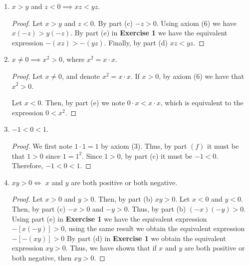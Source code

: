 \documentclass[12pt]{article}
\begin{document}
\begin{enumerate}[label=(\alph*)]
\begin{proof}
			Finally, we consider the case $x > 0$. If $y = 0$, we find a case analogous to when $x = 0$,
			under which by following it's logic we once again land that $-y > -x$. If $y < 0$, we note
			that $-y > 0$ and that $-x < 0$, and thus $-y > -x$. If $y > 0$, we make use of axiom (6)
			to obtain the expression $x - x > y - x$, which is equivalent to $0 > y - x$. Using axiom
			(6) once more we obtain the expression $0 - y > y - x - y$, which is equivalent
			to $-y > -x$.
		\end{proof}
		\item $x > y$ and $z < 0 \implies xz < yz$.
		\begin{proof}
			Let $x > y$ and $z < 0$. By part (c) $-z > 0$. Using axiom (6) we have $x(-z) > y(-z)$.
			By part (e) in \textbf{Exercise 1} we have the equivalent expression $-(xz) > -(yz)$.
			Finally, by part (d) $xz < yz$.
		\end{proof}
		\item $x \neq 0 \implies x^2 > 0$, where $x^2 = x \cdot x$.
		\begin{proof}
			Let $x \neq 0$, and denote $x^2 = x \cdot x$. If $x > 0$, by axiom (6) we have that 
			$x^2 > 0$. 
			
			Let $x < 0$. Then, by part (e) we note $0 \cdot x < x \cdot x$, which is equivalent to
			the expression $0 < x^2$.
		\end{proof}
		\item $-1 < 0 < 1$.
		\begin{proof}
			We first note $1 \cdot 1 = 1$ by axiom (3). Thus, by part $(f)$ it must be that $1 > 0$
			since $1 = 1^2$. Since $1 > 0$, by part (c) it must be $-1 < 0$. Therefore, $-1 < 0 < 1$.
		\end{proof}
		\item $xy > 0 \iff$ $x$ and $y$ are both positive or both negative.
		\begin{proof}
			Let $x > 0$ and $y > 0$. Then, by part (b) $xy > 0$. Let $x < 0$ and $y < 0$.
			Then, by part (c) $-x > 0$ and $-y > 0$. Thus, by part (b) $(-x)(-y) > 0$.
			Using part (e) in \textbf{Exercise 1} we have the equivalent expression $-[x(-y)] > 0$,
			using the same result we obtain the equivalent expression $-[-(xy)] > 0$ By part
			(d) in \textbf{Exercise 1} we obtain the equivalent expression $xy > 0$.
			Thus, we have shown that if $x$ and $y$ are both positive or both negative, then
			$xy > 0$.
			

\end{proof}
\end{enumerate}
\end{document}
